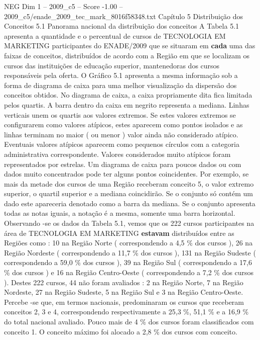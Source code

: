 \begin{textsample}{NEG Dim 1 – 2009\_c5 – Score -1.00 – 2009\_c5/enade\_2009\_tec\_mark\_8016f58348.txt}  \label{ex:f1_neg_291}
Capítulo 5 Distribuição dos Conceitos 5.1 Panorama nacional da distribuição dos conceitos A Tabela 5.1 apresenta a quantidade e o percentual de cursos de TECNOLOGIA EM MARKETING participantes do ENADE/2009 que se situaram em \textbf{cada} uma das faixas de conceitos, distribuídos de acordo com a Região em que se localizam os cursos das instituições de educação superior, mantenedoras dos cursos responsáveis pela oferta.
O Gráfico 5.1 apresenta a mesma informação sob a forma de diagrama de caixa para uma melhor visualização da dispersão dos conceitos obtidos.
No diagrama de caixa, a caixa propriamente dita fica limitada pelos quartis.
A barra dentro da caixa em negrito representa a mediana.
Linhas verticais unem os quartis aos valores extremos.
Se estes valores extremos se configurarem como valores atípicos, estes aparecem como pontos isolados e as linhas terminam no maior ( ou menor ) valor ainda não considerado atípico.
Eventuais valores atípicos aparecem como pequenos círculos com a categoria administrativa correspondente.
Valores considerados muito atípicos foram representados por estrelas.
Um diagrama de caixa para poucos dados ou com dados muito concentrados pode ter alguns pontos coincidentes.
Por exemplo, se mais da metade dos cursos de uma Região receberam conceito 5, o valor extremo superior, o quartil superior e a mediana coincidirão.
Se o conjunto só contém um dado este apareceria denotado como a barra da mediana.
Se o conjunto apresenta todas as notas iguais, a notação é a mesma, somente uma barra horizontal.
Observando -se os dados da Tabela 5.1, vemos que os 222 cursos participantes na área de TECNOLOGIA EM MARKETING \textbf{estavam} distribuídos entre as Regiões como : 10 na Região Norte ( correspondendo a 4,5 \% dos cursos ), 26 na Região Nordeste ( correspondendo a 11,7 \% dos cursos ), 131 na Região Sudeste ( correspondendo a 59,0 \% dos cursos ), 39 na Região Sul ( correspondendo a 17,6 \% dos cursos ) e 16 na Região Centro-Oeste ( correspondendo a 7,2 \% dos cursos ).
Destes 222 cursos, 44 não foram avaliados : 2 na Região Norte, 7 na Região Nordeste, 27 na Região Sudeste, 5 na Região Sul e 3 na Região Centro-Oeste.
Percebe -se que, em termos nacionais, predominaram os cursos que receberam conceitos 2, 3 e 4, correspondendo respectivamente a 25,3 \%, 51,1 \% e a 16,9 \% do total nacional avaliado.
Pouco mais de 4 \% dos cursos foram classificados com conceito 1.
O conceito máximo foi alocado a 2,8 \% dos cursos com conceito.

\end{textsample}
